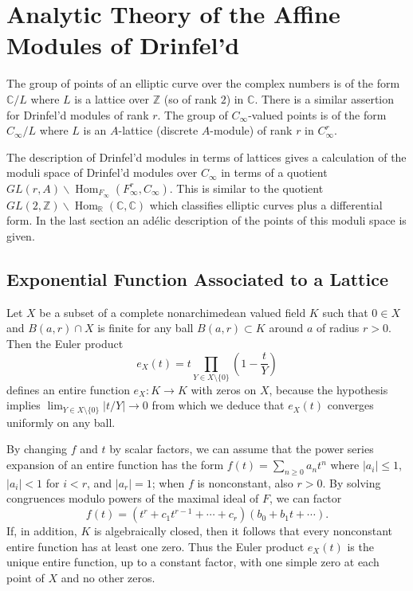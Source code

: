 \documentclass[12pt,a4paper]{article}
\theoremstyle{plain}
\theoremstyle{definition}
\theoremstyle{remark}
\DeclareMathOperator{\Hom}{Hom}
\newcommand{\bC}{\mathbb{C}}
\newcommand{\bZ}{\mathbb{Z}}
\newcommand{\bR}{\mathbb{R}}
\providecommand{\Hom}{\operatorname{Hom}}
\begin{document}
\newpage
\section{Analytic Theory of the Affine Modules of Drinfel'd}
\label{ch:analytic}

The group of points of an elliptic curve over the complex numbers is of the form $\bC/L$ where $L$ is a lattice over $\bZ$ (so of rank $2$) in $\bC$. There is a similar assertion for Drinfel'd modules of rank $r$. The group of $C_\infty$-valued points is of the form $C_\infty/L$ where $L$ is an $A$-lattice (discrete $A$-module) of rank $r$ in $C_\infty^r$.

The description of Drinfel'd modules in terms of lattices gives a calculation of the moduli space of Drinfel'd modules over $C_\infty$ in terms of a quotient $GL(r, A) \backslash \Hom_{F_\infty}(F_\infty^r, C_\infty)$. This is similar to the quotient $GL(2, \bZ) \backslash \Hom_\bR(\bC, \bC)$ which classifies elliptic curves plus a differential form. In the last section an ad\'elic description of the points of this moduli space is given.

\subsection{Exponential Function Associated to a Lattice}
\label{sec:exponential}

Let $X$ be a subset of a complete nonarchimedean valued field $K$ such that $0 \in X$ and $B(a, r) \cap X$ is finite for any ball $B(a, r) \subset K$ around $a$ of radius $r > 0$. Then the Euler product
\[
e_X(t) = t \prod_{Y \in X \setminus \{0\}} \left(1 - \frac{t}{Y}\right)
\]
defines an entire function $e_X: K \to K$ with zeros on $X$, because the hypothesis implies $\lim_{Y \in X \setminus \{0\}} |t/Y| \to 0$ from which we deduce that $e_X(t)$ converges uniformly on any ball.

By changing $f$ and $t$ by scalar factors, we can assume that the power series expansion of an entire function has the form $f(t) = \sum_{n \geq 0} a_n t^n$ where $|a_i| \leq 1$, $|a_i| < 1$ for $i < r$, and $|a_r| = 1$; when $f$ is nonconstant, also $r > 0$. By solving congruences modulo powers of the maximal ideal of $F$, we can factor
\[
f(t) = (t^r + c_1 t^{r-1} + \cdots + c_r)(b_0 + b_1 t + \cdots).
\]
If, in addition, $K$ is algebraically closed, then it follows that every nonconstant entire function has at least one zero. Thus the Euler product $e_X(t)$ is the unique entire function, up to a constant factor, with one simple zero at each point of $X$ and no other zeros.
\end{document}
